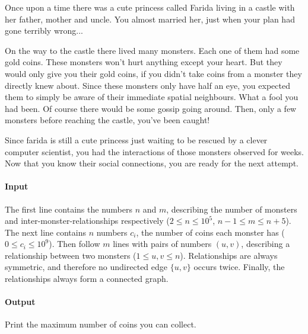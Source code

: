 



\makeheader

Once upon a time there was a cute princess called Farida living in a castle with her father, mother and uncle.
You almost married her, just when your plan had gone terribly wrong...

On the way to the castle there lived many monsters.
Each one of them had some gold coins.
These monsters won't hurt anything except your heart.
But they would only give you their gold coins, if you didn't take coins from a monster they directly knew about.
Since these monsters only have half an eye, you expected them to simply be aware of their immediate spatial neighbours.
What a fool you had been.
Of course there would be some gossip going around.
Then, only a few monsters before reaching the castle, you've been caught!

Since farida is still a cute princess just waiting to be rescued by a clever computer scientist, you had the interactions of those monsters observed for weeks.
Now that you know their social connections, you are ready for the next attempt.

\paragraph*{Input}

The first line contains the numbers $n$ and $m$, describing the number of monsters and inter-monster-relationships respectively ($2 \leq n \leq 10^5$, $n - 1 \leq m \leq n + 5$).
The next line contains $n$ numbers $c_i$, the number of coins each monster has ($0 \leq c_i \leq 10^9$).
Then follow $m$ lines with pairs of numbers $(u, v)$, describing a relationship between two monsters ($1 \leq u, v \leq n$).
Relationships are always symmetric, and therefore no undirected edge $\{u, v\}$ occurs twice.
Finally, the relationships always form a connected graph.

\paragraph*{Output}

Print the maximum number of coins you can collect.

\begin{samples}
\end{samples}

